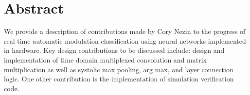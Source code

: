 \section{Abstract}
We provide a description of contributions made by Cory Nezin to the progress of real time automatic modulation classification using neural networks implemented in hardware.  Key design contributions to be discussed include: design and implementation of time domain multiplexed convolution and matrix multiplication as well as systolic max pooling, arg max, and layer connection logic.  One other contribution is the implementation of simulation verification code.
